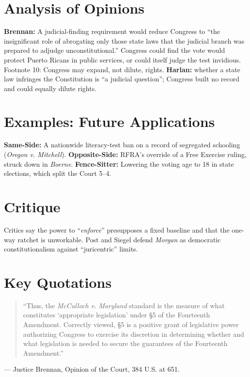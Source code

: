 \documentclass[12pt]{article}
\begin{document}
\section{Analysis of Opinions}
\textbf{Brennan:} A judicial-finding requirement would reduce Congress to ``the insignificant role of abrogating only those state laws that the judicial branch was prepared to adjudge unconstitutional.'' Congress could find the vote would protect Puerto Ricans in public services, or could itself judge the test invidious. Footnote 10: Congress may expand, not dilute, rights. \textbf{Harlan:} whether a state law infringes the Constitution is ``a judicial question''; Congress built no record and could equally dilute rights.

\section{Examples: Future Applications}
\textbf{Same-Side:} A nationwide literacy-test ban on a record of segregated schooling (\textit{Oregon v. Mitchell}). \textbf{Opposite-Side:} RFRA's override of a Free Exercise ruling, struck down in \textit{Boerne}. \textbf{Fence-Sitter:} Lowering the voting age to 18 in state elections, which split the Court 5--4.

\section{Critique}
Critics say the power to ``\textit{enforce}'' presupposes a fixed baseline and that the one-way ratchet is unworkable. Post and Siegel defend \textit{Morgan} as democratic constitutionalism against ``juricentric'' limits.

\section{Key Quotations}
\begin{quote}
``Thus, the \textit{McCulloch v. Maryland} standard is the measure of what constitutes `appropriate legislation' under \S 5 of the Fourteenth Amendment. Correctly viewed, \S 5 is a positive grant of legislative power authorizing Congress to exercise its discretion in determining whether and what legislation is needed to secure the guarantees of the Fourteenth Amendment.''
\end{quote}
\noindent --- Justice Brennan, Opinion of the Court, 384 U.S. at 651.
\end{document}
